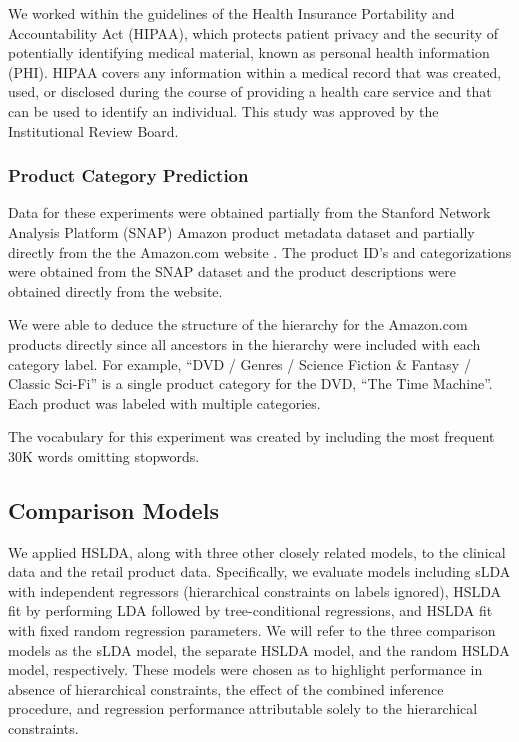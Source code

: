 \documentclass{article}
\begin{document}
We worked within the guidelines of the Health Insurance Portability
and Accountability Act (HIPAA), which protects patient privacy and
the security of potentially identifying medical material, known as
personal health information (PHI). HIPAA covers any information within
a medical record that was created, used, or disclosed during the course
of providing a health care service and that can be used to identify
an individual. This study was approved by the Institutional Review
Board.


\subsubsection{Product Category Prediction}

Data for these experiments were obtained partially from the Stanford
Network Analysis Platform (SNAP) Amazon product metadata dataset \citep{SNAP}
and partially directly from the the Amazon.com website \citep{AMAZON}.
The product ID's and categorizations were obtained from the SNAP dataset
and the product descriptions were obtained directly from the website.

We were able to deduce the structure of the hierarchy for the Amazon.com
products directly since all ancestors in the hierarchy were included
with each category label. For example, {}``DVD / Genres / Science
Fiction \& Fantasy / Classic Sci-Fi'' is a single product category
for the DVD, {}``The Time Machine''. Each product was labeled with
multiple categories.

The vocabulary for this experiment was created by including the most
frequent 30K words omitting stopwords.


\subsection{Comparison Models}

We applied HSLDA, along with three other closely related models, to
the clinical data and the retail product data. Specifically, we evaluate
models including sLDA with independent regressors (hierarchical constraints
on labels ignored), HSLDA fit by performing LDA followed by tree-conditional
regressions, and HSLDA fit with fixed random regression parameters.
We will refer to the three comparison models as the sLDA model, the
separate HSLDA model, and the random HSLDA model, respectively. These
models were chosen as to highlight performance in absence of hierarchical
constraints, the effect of the combined inference procedure, and regression
performance attributable solely to the hierarchical constraints.
\end{document}
